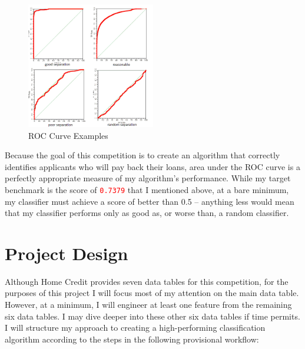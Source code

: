 \documentclass[12pt, letterpaper]{article}
\begin{document}
\begin{figure}[ht]
\includegraphics[width=0.5\textwidth]{roccurves}
\centering
\caption{ROC Curve Examples\cite{mlwikirocanalysis}}
\end{figure}

Because the goal of this competition is to create an algorithm that correctly identifies applicants who will pay back their loans, area under the ROC curve is a perfectly appropriate measure of my algorithm's performance. While my target benchmark is the score of \colorbox{backcolor}{\textcolor{red}{\texttt{0.7379}}} that I mentioned above, at a bare minimum, my classifier must achieve a score of better than 0.5 -- anything less would mean that my classifier performs only as good as, or worse than, a random classifier.

\section{Project Design}
Although Home Credit provides seven data tables for this competition, for the purposes of this project I will focus most of my attention on the main data table. However, at a minimum, I will engineer at least one feature from the remaining six data tables. I may dive deeper into these other six data tables if time permits. I will structure my approach to creating a high-performing classification algorithm according to the steps in the following provisional workflow:
\end{document}
